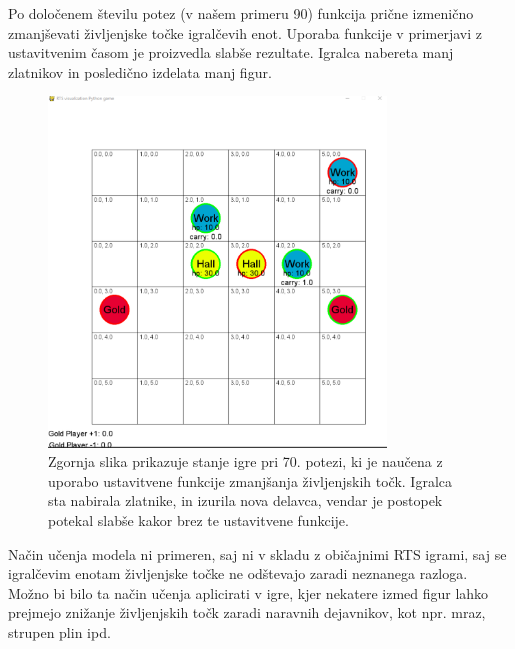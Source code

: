 \documentclass[a4paper, 12pt]{book}
\begin{document}
Po določenem številu potez (v našem primeru 90) funkcija prične izmenično zmanjševati življenjske točke igralčevih enot.
Uporaba funkcije v primerjavi z ustavitvenim časom je proizvedla slabše rezultate.
Igralca nabereta manj zlatnikov in posledično izdelata manj figur.

\begin{figure}[h!]
	\begin{center}
		\includegraphics[width=0.8\textwidth]{photos/killFunction.pdf}
	\end{center}
	\caption{Zgornja slika prikazuje stanje igre pri 70. potezi, ki je naučena z uporabo ustavitvene funkcije zmanjšanja življenjskih točk. 
		Igralca sta nabirala zlatnike, in izurila nova delavca, vendar je postopek potekal slabše kakor brez te ustavitvene funkcije. }
	\label{vizualizacijaRezultatovKillFunction}
\end{figure}

Način učenja modela ni primeren, saj ni v skladu z običajnimi RTS igrami, saj se igralčevim enotam življenjske točke ne odštevajo zaradi neznanega razloga.
Možno bi bilo ta način učenja aplicirati v igre, kjer nekatere izmed figur lahko prejmejo znižanje življenjskih točk zaradi naravnih dejavnikov, kot npr. mraz, strupen plin ipd.
\end{document}
